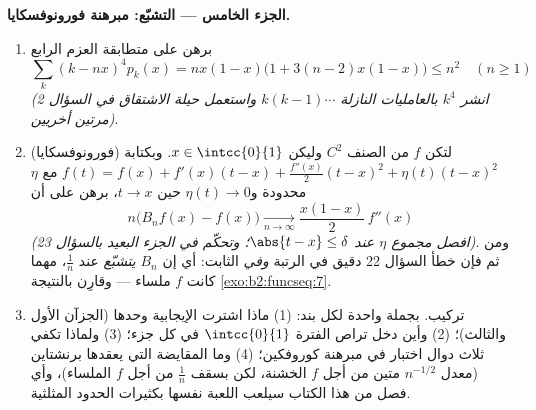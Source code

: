 \begin{problem}
\medskip
\noindent\textbf{الجزء الخامس --- التشبّع: مبرهنة
فورونوفسكايا.}
\begin{enumerate}[resume]
  \item برهن على متطابقة العزم الرابع
        \[
        \sum_k (k - nx)^4 p_k(x)
        = nx(1-x)\bigl(1 + 3(n-2)x(1-x)\bigr) \leq n^2
        \quad (n \geq 1)
        \]
        \emph{(انشر $k^4$ بالعامليات النازلة $k(k-1)\cdots$
        واستعمل حيلة الاشتقاق في السؤال 2 مرتين
        أخريين)}.
  \item (فورونوفسكايا) لتكن $f$ من الصنف $C^2$ وليكن $x \in
        \intcc{0}{1}$. وبكتابة $f(t) = f(x) + f'(x)(t-x) +
        \frac{f''(x)}2(t-x)^2 + \eta(t)(t-x)^2$ مع $\eta$
        محدودة و$\eta(t) \to 0$ حين $t \to x$، برهن على أن
        \[
        n\bigl(B_nf(x) - f(x)\bigr)
        \xrightarrow[n\to\infty]{}
        \frac{x(1-x)}{2}\,f''(x)
        \]
        \emph{(افصل مجموع $\eta$ عند $\abs{t - x} \leq
        \delta$؛ وتحكّم في الجزء البعيد بالسؤال 23)}. ومن ثم
        فإن خطأ السؤال 22 دقيق في الرتبة \emph{وفي}
        الثابت: أي إن $B_n$ \emph{يتشبّع} عند $\frac1n$، مهما كانت
        $f$ ملساء --- وقارِن بالنتيجة
        \cref{exo:b2:funcseq:7}.
  \item تركيب. بجملة واحدة لكل بند: (1) ماذا اشترت الإيجابية
        وحدها (الجزآن الأول والثالث)؛ (2) وأين دخل تراص
        الفترة $\intcc{0}{1}$ في كل جزء؛ (3) ولماذا تكفي ثلاث
        دوال اختبار في مبرهنة كوروفكين؛ (4) وما المقايضة التي
        يعقدها برنشتاين (معدل $n^{-1/2}$ متين من أجل $f$
        الخشنة، لكن بسقف $\frac1n$ من أجل $f$ الملساء)، وأي
        فصل من هذا الكتاب سيلعب اللعبة نفسها بكثيرات
        الحدود المثلثية.
\end{enumerate}
\end{problem}
